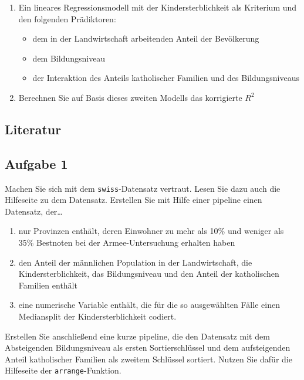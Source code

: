 \documentclass[
]{book}
\providecommand{\tightlist}{%
  \setlength{\itemsep}{0pt}\setlength{\parskip}{0pt}}
\begin{document}
\begin{enumerate}
\def\labelenumi{\arabic{enumi}.}
\setcounter{enumi}{2}
\tightlist
\item
  Ein lineares Regressionsmodell mit der Kindersterblichkeit als Kriterium und den folgenden Prädiktoren:

  \begin{itemize}
  \tightlist
  \item
    dem in der Landwirtschaft arbeitenden Anteil der Bevölkerung
  \item
    dem Bildungsniveau
  \item
    der Interaktion des Anteils katholischer Familien und des Bildungsniveaus
  \end{itemize}
\item
  Berechnen Sie auf Basis dieses zweiten Modells das korrigierte \(R^2\)
\end{enumerate}

\hypertarget{literatur}{%
\subsection{Literatur}\label{literatur}}

\hypertarget{aufgabe-1-1}{%
\subsection{Aufgabe 1}\label{aufgabe-1-1}}

Machen Sie sich mit dem \texttt{swiss}-Datensatz vertraut. Lesen Sie dazu auch die Hilfeseite zu dem Datensatz.
Erstellen Sie mit Hilfe einer pipeline einen Datensatz, der\ldots{}

\begin{enumerate}
\def\labelenumi{\arabic{enumi}.}
\item
  nur Provinzen enthält, deren Einwohner zu mehr als 10\% und weniger als 35\% Bestnoten bei der Armee-Untersuchung erhalten haben
\item
  den Anteil der männlichen Population in der Landwirtschaft, die Kindersterblichkeit, das Bildungsniveau und den Anteil der katholischen Familien enthält
\item
  eine numerische Variable enthält, die für die so ausgewählten Fälle einen Mediansplit der Kindersterblichkeit codiert.
\end{enumerate}

Erstellen Sie anschließend eine kurze pipeline, die den Datensatz mit dem Absteigenden Bildungsniveau als ersten Sortierschlüssel und dem aufsteigenden Anteil katholischer Familien als zweitem Schlüssel sortiert. Nutzen Sie dafür die Hilfeseite der \texttt{arrange}-Funktion.
\end{document}
